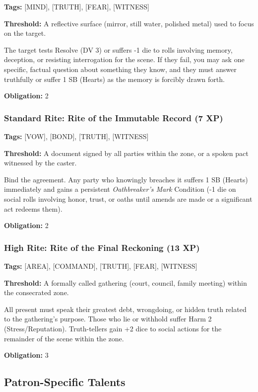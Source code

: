 \textbf{Tags:} [MIND], [TRUTH], [FEAR], [WITNESS]

\textbf{Threshold:} A reflective surface (mirror, still water, polished metal) used to focus on the target.

The target tests Resolve (DV 3) or suffers -1 die to rolls involving memory, deception, or resisting interrogation for the scene. If they fail, you may ask one specific, factual question about something they know, and they must answer truthfully or suffer 1 SB (Hearts) as the memory is forcibly drawn forth.

\textbf{Obligation:} 2

\subsubsection{Standard Rite: Rite of the Immutable Record (7 XP)}

\textbf{Tags:} [VOW], [BOND], [TRUTH], [WITNESS]

\textbf{Threshold:} A document signed by all parties within the zone, or a spoken pact witnessed by the caster.

Bind the agreement. Any party who knowingly breaches it suffers 1 SB (Hearts) immediately and gains a persistent \textit{Oathbreaker's Mark} Condition (-1 die on social rolls involving honor, trust, or oaths until amends are made or a significant act redeems them).

\textbf{Obligation:} 2

\subsubsection{High Rite: Rite of the Final Reckoning (13 XP)}

\textbf{Tags:} [AREA], [COMMAND], [TRUTH], [FEAR], [WITNESS]

\textbf{Threshold:} A formally called gathering (court, council, family meeting) within the consecrated zone.

All present must speak their greatest debt, wrongdoing, or hidden truth related to the gathering's purpose. Those who lie or withhold suffer Harm 2 (Stress/Reputation). Truth-tellers gain +2 dice to social actions for the remainder of the scene within the zone.

\textbf{Obligation:} 3

\subsection{Patron-Specific Talents}

